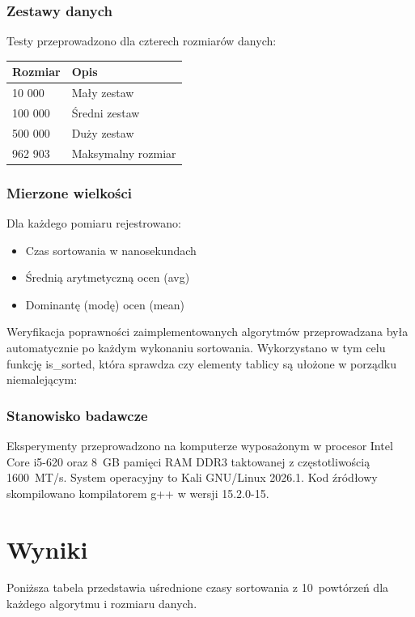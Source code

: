 \documentclass[12pt,a4paper,twocolumn]{article}
\begin{document}
\newpage
\subsubsection*{Zestawy danych}
Testy przeprowadzono dla czterech rozmiarów danych:
\begin{table}[H]
\centering
\begin{tabular}{ll}
Rozmiar & Opis \\ \hline
10 000 & Mały zestaw \\ \hline
100 000 & Średni zestaw \\ \hline
500 000 & Duży zestaw \\ \hline
962 903 & Maksymalny rozmiar \\ \hline
\end{tabular}
\end{table}

\subsubsection*{Mierzone wielkości}
Dla każdego pomiaru rejestrowano:  
\begin{itemize}
    \item Czas sortowania w nanosekundach
    \item Średnią arytmetyczną ocen (avg)
    \item Dominantę (modę) ocen (mean) 
\end{itemize}

Weryfikacja poprawności zaimplementowanych algorytmów przeprowadzana była 
automatycznie po każdym wykonaniu sortowania. 
Wykorzystano w tym celu funkcję is\_sorted, która sprawdza czy elementy tablicy 
są ułożone w porządku niemalejącym:


\subsubsection*{Stanowisko badawcze}
Eksperymenty przeprowadzono na komputerze wyposażonym w procesor 
Intel Core i5-620 oraz 8~GB pamięci RAM DDR3 
taktowanej z częstotliwością 1600~MT/s. System operacyjny to 
Kali GNU/Linux 2026.1. Kod źródłowy skompilowano kompilatorem 
g++ w wersji 15.2.0-15.

\section{Wyniki}
Poniższa tabela przedstawia uśrednione czasy sortowania z 10~powtórzeń
dla każdego algorytmu i rozmiaru danych.
\end{document}
